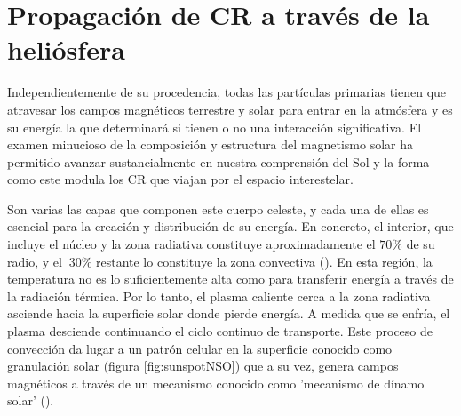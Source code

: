 \section{Propagación de CR a través de la heliósfera}

Independientemente de su procedencia, todas las partículas primarias tienen que atravesar los campos magnéticos terrestre y solar para entrar en la atmósfera y es su energía la que determinará si tienen o no una interacción significativa. El examen minucioso de la composición y estructura del magnetismo solar ha permitido avanzar sustancialmente en nuestra comprensión del Sol y la forma como este modula los CR que viajan por el espacio interestelar. 

Son varias las capas que componen este cuerpo celeste, y cada una de ellas es esencial para la creación y distribución de su energía. En concreto, el interior, que incluye el núcleo y la zona radiativa constituye aproximadamente el $70\%$ de su radio, y el $~30\%$ restante lo constituye la zona convectiva (\cite{Hanslmeier_2023}). En esta región, la temperatura no es lo suficientemente alta como para transferir energía a través de la radiación térmica. Por lo tanto, el plasma caliente cerca a la zona radiativa asciende hacia la superficie solar donde pierde energía. A medida que se enfría, el plasma desciende continuando el ciclo continuo de transporte. Este proceso de convección da lugar a un patrón celular en la superficie conocido como granulación solar (figura \ref{fig:sunspotNSO}) que a su vez, genera campos magnéticos a través de un mecanismo conocido como 'mecanismo de dínamo solar' (\cite{Sturrock_1986}).
